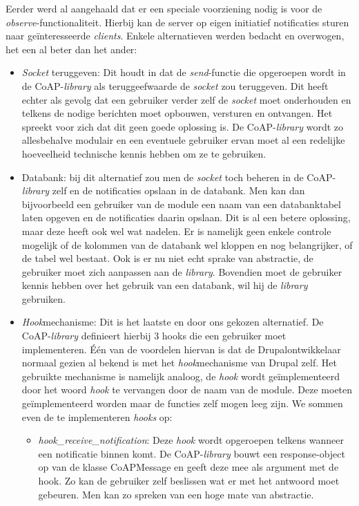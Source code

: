 Eerder werd al aangehaald dat er een speciale voorziening nodig is voor de \textit{observe}-functionaliteit. Hierbij kan de server op eigen initiatief notificaties sturen naar ge\"{i}nteresseerde \textit{clients}. Enkele alternatieven werden bedacht en overwogen, het een al beter dan het ander:
\begin{itemize}
\item \textit{Socket} teruggeven: Dit houdt in dat de \textit{send}-functie die opgeroepen wordt in de CoAP-\textit{library} als teruggeefwaarde de \textit{socket} zou teruggeven. Dit heeft echter als gevolg dat een gebruiker verder zelf de \textit{socket} moet onderhouden en telkens de nodige berichten moet opbouwen, versturen en ontvangen. Het spreekt voor zich dat dit geen goede oplossing is. De CoAP-\textit{library} wordt zo allesbehalve modulair en een eventuele gebruiker ervan moet al een redelijke hoeveelheid technische kennis hebben om ze te gebruiken.
\item Databank: bij dit alternatief zou men de \textit{socket} toch beheren in de CoAP-\textit{library} zelf en de notificaties opslaan in de databank. Men kan dan bijvoorbeeld een gebruiker van de module een naam van een databanktabel laten opgeven en de notificaties daarin opslaan. Dit is al een betere oplossing, maar deze heeft ook wel wat nadelen. Er is namelijk geen enkele controle mogelijk of de kolommen van de databank wel kloppen en nog belangrijker, of de tabel wel bestaat. Ook is er nu niet echt sprake van abstractie, de gebruiker moet zich aanpassen aan de \textit{library}. Bovendien moet de gebruiker kennis hebben over het gebruik van een databank, wil hij de \textit{library} gebruiken.
\item \textit{Hook}mechanisme: Dit is het laatste en door ons gekozen alternatief. De CoAP-\textit{library} definieert hierbij 3 hooks die een gebruiker moet implementeren. \'{E}\'{e}n van de voordelen hiervan is dat de Drupalontwikkelaar normaal gezien al bekend is met het \textit{hook}mechanisme van Drupal zelf. Het gebruikte mechanisme is namelijk analoog, de \textit{hook} wordt ge\"{i}mplementeerd door het woord \textit{hook} te vervangen door de naam van de module. Deze moeten ge\"{i}mplementeerd worden maar de functies zelf mogen leeg zijn. We sommen even de te implementeren \textit{hooks} op:
\begin{itemize}
\item \textit{hook\_receive\_notification}: Deze \textit{hook} wordt opgeroepen telkens wanneer een notificatie binnen komt. De CoAP-\textit{library} bouwt een response-object op van de klasse CoAPMessage en geeft deze mee als argument met de hook. Zo kan de gebruiker zelf beslissen wat er met het antwoord moet gebeuren. Men kan zo spreken van een hoge mate van abstractie.

\end{itemize}
\end{itemize}
